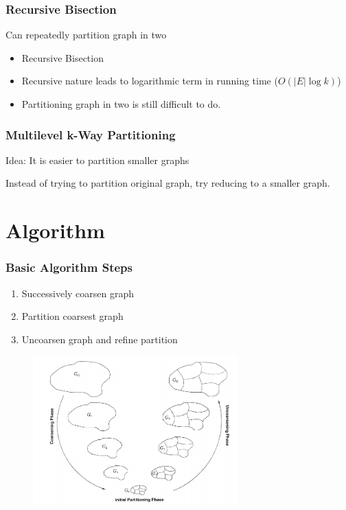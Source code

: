 \documentclass{beamer}
\begin{document}
\begin{frame}
  \frametitle{Recursive Bisection}

  Can repeatedly partition graph in two
  \begin{itemize}
    \item Recursive Bisection
    \item Recursive nature leads to logarithmic term in running time ($O(|E| \log k)$)
    \item Partitioning graph in two is still difficult to do.
  \end{itemize}

\end{frame}

\begin{frame}
  \frametitle{Multilevel k-Way Partitioning}

  \begin{block}{Idea:}
    It is easier to partition smaller graphs
  \end{block}

  Instead of trying to partition original graph, try reducing to a smaller graph.

\end{frame}

\section{Algorithm}

\begin{frame}
  \frametitle{Basic Algorithm Steps}

  \begin{enumerate}
    \item
      Successively coarsen graph
    \item
      Partition coarsest graph
    \item
      Uncoarsen graph and refine partition
  \end{enumerate}

  \begin{figure}
    \centering
    \includegraphics[width=0.7\textwidth]{./multilevel.png}
  \end{figure}

\end{frame}
\end{document}
